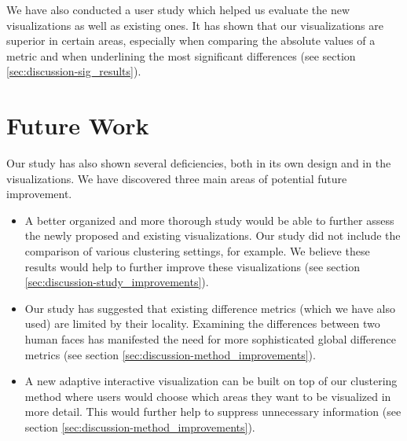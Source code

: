We have also conducted a user study which helped us evaluate the new visualizations as well as existing ones. It has shown that our visualizations are superior in certain areas, especially when comparing the absolute values of a metric and when underlining the most significant differences (see section \ref{sec:discussion-sig_results}).

\section*{Future Work}

Our study has also shown several deficiencies, both in its own design and in the visualizations. We have discovered three main areas of potential future improvement.

\begin{itemize}
	\item A better organized and more thorough study would be able to further assess the newly proposed and existing visualizations. Our study did not include the comparison of various clustering settings, for example. We believe these results would help to further improve these visualizations (see section \ref{sec:discussion-study_improvements}).
	\item Our study has suggested that existing difference metrics (which we have also used) are limited by their locality. Examining the differences between two human faces has manifested the need for more sophisticated global difference metrics (see section \ref{sec:discussion-method_improvements}).
	\item A new adaptive interactive visualization can be built on top of our clustering method where users would choose which areas they want to be visualized in more detail. This would further help to suppress unnecessary information (see section \ref{sec:discussion-method_improvements}).
\end{itemize}